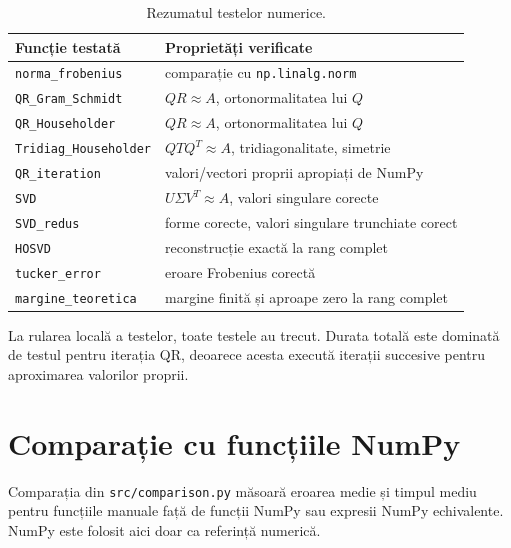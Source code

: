 \documentclass[12pt,a4paper]{article}
\theoremstyle{definition}
\begin{document}
\begin{table}[H]
\centering
\begin{tabular}{ll}
\toprule
Funcție testată & Proprietăți verificate \\
\midrule
\texttt{norma\_frobenius} & comparație cu \texttt{np.linalg.norm} \\
\texttt{QR\_Gram\_Schmidt} & $QR\approx A$, ortonormalitatea lui $Q$ \\
\texttt{QR\_Householder} & $QR\approx A$, ortonormalitatea lui $Q$ \\
\texttt{Tridiag\_Householder} & $QTQ^T\approx A$, tridiagonalitate, simetrie \\
\texttt{QR\_iteration} & valori/vectori proprii apropiați de NumPy \\
\texttt{SVD} & $U\Sigma V^T\approx A$, valori singulare corecte \\
\texttt{SVD\_redus} & forme corecte, valori singulare trunchiate corect \\
\texttt{HOSVD} & reconstrucție exactă la rang complet \\
\texttt{tucker\_error} & eroare Frobenius corectă \\
\texttt{margine\_teoretica} & margine finită și aproape zero la rang complet \\
\bottomrule
\end{tabular}
\caption{Rezumatul testelor numerice.}
\end{table}

La rularea locală a testelor, toate testele au trecut. Durata totală este dominată de testul pentru iterația QR, deoarece acesta execută iterații succesive pentru aproximarea valorilor proprii.

\section{Comparație cu funcțiile NumPy}

Comparația din \texttt{src/comparison.py} măsoară eroarea medie și timpul mediu pentru funcțiile manuale față de funcții NumPy sau expresii NumPy echivalente. NumPy este folosit aici doar ca referință numerică.
\end{document}
